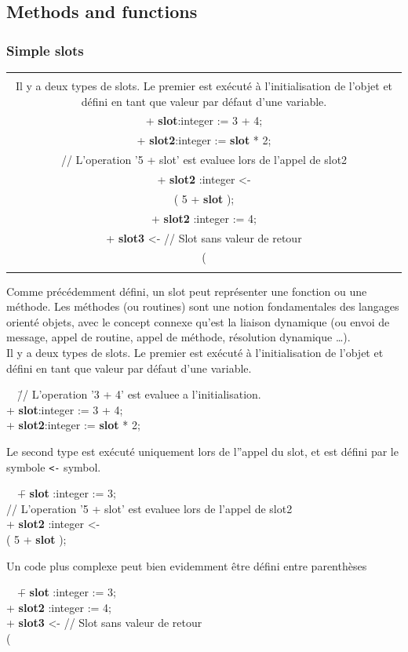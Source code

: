 \documentclass[11pt]{mybook}
\newcommand{\fr}[1]{
  \if \frenchversion 1
    \if \englishversion 1    
    \vspace{2mm}
    \noindent\begin{tabular}{|c}
      {
        \begin{minipage}{15.5cm}
          \textit{#1}
        \end{minipage}
      }
    \end{tabular}
    \else
    #1
    \fi
  \fi
}
\begin{document}
\subsection{Methods and functions}
\label{quickstart:slots:methods_functions}
%
\subsubsection{Simple slots}
\label{quickstart:slots:methods_functions:simple_slots}
%
\fr{
Comme pr\'ec\'edemment d\'efini, un slot peut repr\'esenter une fonction ou une m\'ethode.
Les m\'ethodes (ou routines) sont une notion fondamentales des langages
orient\'e objets, avec le concept connexe qu'est la liaison dynamique
(ou envoi de message, appel de routine, appel de m\'ethode, r\'esolution
dynamique \ldots).\\ 
Il y a deux types de slots. Le premier est ex\'ecut\'e \`a l'initialisation
de l'objet et d\'efini en tant que valeur par d\'efaut d'une variable. 
{\tt\begin{tabbing}
~~\= // L'operation '3 + 4' est evaluee a l'initialisation.\\
  \> + {\bf{}slot}:{\sc{}integer}  := 3 + 4; \\
  \> + {\bf{}slot2}:{\sc{}integer}  := {\bf{}slot} * 2;
\end{tabbing}}
Le second type est ex\'ecut\'e uniquement lors de l''appel du slot, et est
d\'efini par le symbole {\tt <-} symbol. 
{\tt\begin{tabbing}
~~\=+ {\bf{}slot}  :{\sc{}integer}  := 3;\\
  \>// L'operation '5 + slot' est evaluee lors de l'appel de slot2\\
  \>+ {\bf{}slot2} :{\sc{}integer}  <-\\
  \>( 5 + {\bf{}slot} );   
\end{tabbing}}
Un code plus complexe peut bien evidemment être d\'efini entre parenthèses
{\tt\begin{tabbing}
~~\= + {\bf{}slot}  :{\sc{}integer}  := 3;\\
  \> + {\bf{}slot2} :{\sc{}integer}  := 4;\\
  \> + {\bf{}slot3}  <-     // Slot sans valeur de retour\\
  \> (\\

\end{tabbing}}}
\end{document}

